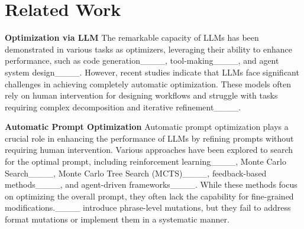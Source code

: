 \section{Related Work}

\noindent \textbf{Optimization via LLM}
The remarkable capacity of LLMs has been demonstrated in various tasks as optimizers, leveraging their ability to enhance performance, such as code generation____, tool-making____, and agent system design____. 
However, recent studies indicate that LLMs face significant challenges in achieving completely automatic optimization. These models often rely on human intervention for designing workflows and struggle with tasks requiring complex decomposition and iterative refinement____.


\noindent \textbf{Automatic Prompt Optimization}
Automatic prompt optimization plays a crucial role in enhancing the performance of LLMs by refining prompts without requiring human intervention. 
Various approaches have been explored to search for the optimal prompt, including reinforcement learning____, Monte Carlo Search____, Monte Carlo Tree Search (MCTS)____, feedback-based methods____, and agent-driven frameworks____.
While these methods focus on optimizing the overall prompt, they often lack the capability for fine-grained modifications.____ introduce phrase-level mutations, but they fail to address format mutations or implement them in a systematic manner.




